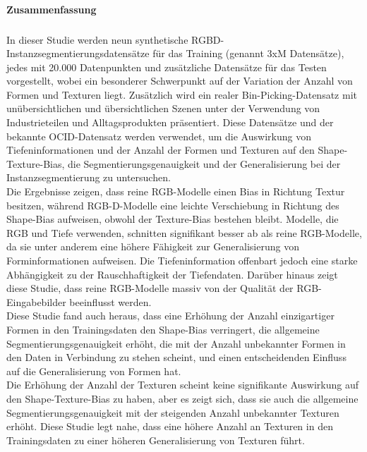 \cleardoublepage

\thispagestyle{empty}
\textsf{\large\textbf{Zusammenfassung}}
\subsubsection*{\hsmatitelde}%
In dieser Studie werden neun synthetische RGBD-Instanzsegmentierungsdatensätze für das Training (genannt 3xM Datensätze), jedes mit 20.000 Datenpunkten und zusätzliche Datensätze für das Testen vorgestellt, wobei ein besonderer Schwerpunkt auf der Variation der Anzahl von Formen und Texturen liegt. Zusätzlich wird ein realer Bin-Picking-Datensatz mit unübersichtlichen und übersichtlichen Szenen unter der Verwendung von Industrieteilen und Alltagsprodukten präsentiert. Diese Datensätze und der bekannte OCID-Datensatz werden verwendet, um die Auswirkung von Tiefeninformationen und der Anzahl der Formen und Texturen auf den Shape-Texture-Bias, die Segmentierungsgenauigkeit und der Generalisierung bei der Instanzsegmentierung zu untersuchen.\\
Die Ergebnisse zeigen, dass reine RGB-Modelle einen Bias in Richtung Textur besitzen, während RGB-D-Modelle eine leichte Verschiebung in Richtung des Shape-Bias aufweisen, obwohl der Texture-Bias bestehen bleibt. Modelle, die RGB und Tiefe verwenden, schnitten signifikant besser ab als reine RGB-Modelle, da sie unter anderem eine höhere Fähigkeit zur Generalisierung von Forminformationen aufweisen.  Die Tiefeninformation offenbart jedoch eine starke Abhängigkeit zu der Rauschhaftigkeit der Tiefendaten. Darüber hinaus zeigt diese Studie, dass reine RGB-Modelle massiv von der Qualität der RGB-Eingabebilder beeinflusst werden.\\
Diese Studie fand auch heraus, dass eine Erhöhung der Anzahl einzigartiger Formen in den Trainingsdaten den Shape-Bias verringert, die allgemeine Segmentierungsgenauigkeit erhöht, die mit der Anzahl unbekannter Formen in den Daten in Verbindung zu stehen scheint, und einen entscheidenden Einfluss auf die Generalisierung von Formen hat. \\
Die Erhöhung der Anzahl der Texturen scheint keine signifikante Auswirkung auf den Shape-Texture-Bias zu haben, aber es zeigt sich, dass sie auch die allgemeine Segmentierungsgenauigkeit mit der steigenden Anzahl unbekannter Texturen erhöht. Diese Studie legt nahe, dass eine höhere Anzahl an Texturen in den Trainingsdaten zu einer höheren Generalisierung von Texturen führt.

